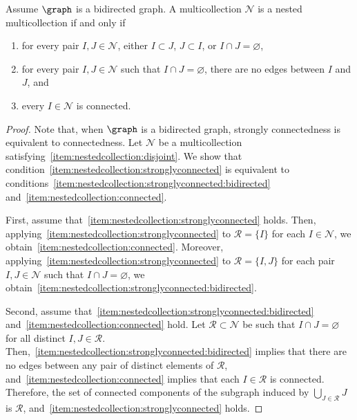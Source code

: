 \begin{lemm} \label{lemma:nestedcollection:bidirected}
    Assume \(\graph\) is a bidirected graph.
    A multicollection \(\mathcal{N}\) is a nested multicollection if and only if
    \begin{enumerate}[label = \textup{(N\arabic*')}, ref = (N\arabic*'), leftmargin = .6in]
        \item[\textup{(N1)}]
        for every pair \(I, J \in \mathcal{N}\),
        either \(I \subset J\), \(J \subset I\), or \(I \cap J = \varnothing\),
        \setcounter{enumi}{1}
        \item \label{item:nestedcollection:stronglyconnected:bidirected}
        for every pair \(I, J \in \mathcal{N}\) such that \(I \cap J = \varnothing\),
        there are no edges between \(I\) and \(J\), and
        \item \label{item:nestedcollection:connected}
        every \(I \in \mathcal{N}\) is connected.
    \end{enumerate}
\end{lemm}

\begin{proof}
    Note that, when \(\graph\) is a bidirected graph,
    strongly connectedness is equivalent to connectedness.
    Let \(\mathcal{N}\) be a multicollection satisfying~\ref{item:nestedcollection:disjoint}.
    We show that condition~\ref{item:nestedcollection:stronglyconnected} is equivalent to conditions~\ref{item:nestedcollection:stronglyconnected:bidirected} and~\ref{item:nestedcollection:connected}.

    First, assume that~\ref{item:nestedcollection:stronglyconnected} holds.
    Then, applying~\ref{item:nestedcollection:stronglyconnected} to \(\mathcal{R} = \{I\}\) for each \(I \in \mathcal{N}\), we obtain~\ref{item:nestedcollection:connected}.
    Moreover, applying~\ref{item:nestedcollection:stronglyconnected} to \(\mathcal{R} = \{I, J\}\) for each pair \(I, J \in \mathcal{N}\) such that \(I \cap J = \varnothing\), we obtain~\ref{item:nestedcollection:stronglyconnected:bidirected}.

    Second, assume that~\ref{item:nestedcollection:stronglyconnected:bidirected} and~\ref{item:nestedcollection:connected} hold.
    Let \(\mathcal{R} \subset \mathcal{N}\) be such that \(I \cap J = \varnothing\) for all distinct \(I, J \in \mathcal{R}\).
    Then,~\ref{item:nestedcollection:stronglyconnected:bidirected} implies that there are no edges between any pair of distinct elements of \(\mathcal{R}\), and~\ref{item:nestedcollection:connected} implies that each \(I \in \mathcal{R}\) is connected.
    Therefore, the set of connected components of the subgraph induced by \(\bigcup_{J \in \mathcal{R}} J\) is \(\mathcal{R}\),
    and~\ref{item:nestedcollection:stronglyconnected} holds.
\end{proof}

